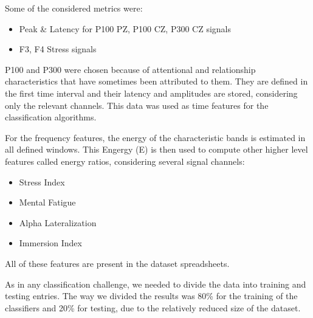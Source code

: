\documentclass[extendedabs]{recpad2k}
\begin{document}
Some of the considered metrics were:
\begin{itemize}[noitemsep,nolistsep]
\item Peak \& Latency for P100 PZ, P100 CZ, P300 CZ signals
\item F3, F4 Stress signals
\end{itemize}
\vspace{2pt}
P100 and P300 were chosen because of attentional and relationship characteristics that have sometimes been attributed to them.
They are defined in the first time interval and their latency and amplitudes are stored, considering only the relevant channels.
This data was used as time features for the classification algorithms.

For the frequency features, the energy of the characteristic bands is estimated in all defined windows.
This Engergy (E) is then used to compute other higher level features called energy ratios, considering several signal channels:
\begin{itemize}[noitemsep,nolistsep]
\item Stress Index
\item Mental Fatigue
\item Alpha Lateralization
\item Immersion Index
\end{itemize}
\vspace{2pt}
All of these features are present in the dataset spreadsheets.

As in any classification challenge, we needed to divide the data into training and testing entries.
The way we divided the results was 80\% for the training of the classifiers and 20\% for testing, due to the relatively reduced size of the dataset.


\end{document}
